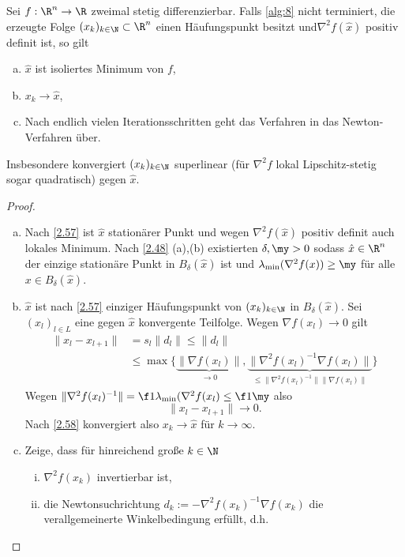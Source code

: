 \begin{st} \label{2.59}
	Sei $f: \R^n \to \R$ zweimal stetig differenzierbar.
	Falls \ref{alg:8} nicht terminiert, die erzeugte Folge $(x_k)_{k\in\N} \subset \R^n$ einen Häufungspunkt besitzt und$\nabla^2 f(\hat x)$ positiv definit ist, so gilt
	\begin{enumerate}[(a)]
		\item
			$\hat x$ ist isoliertes Minimum von $f$,
		\item
			$x_k \to \hat x$,
		\item
			Nach endlich vielen Iterationsschritten geht das Verfahren in das Newton-Verfahren über.
	\end{enumerate}
	Insbesondere konvergiert $(x_k)_{k\in \N}$ superlinear (für $\nabla^2 f$ lokal Lipschitz-stetig sogar quadratisch) gegen $\hat x$.
	\begin{proof}
		\begin{enumerate}[(a)]
			\item
				Nach \ref{2.57} ist $\hat x$ stationärer Punkt und wegen $\nabla^2 f(\hat x)$ positiv definit auch lokales Minimum.
				Nach \ref{2.48} (a),(b) existierten $\delta, \my > 0$ sodass $\hat x \in \R^n$ der einzige stationäre Punkt in $B_\delta(\hat x)$ ist und $\lambda_{\text{min}} (\nabla^2 f(x)) \ge \my$ für alle $x \in B_\delta(\hat x)$.
			\item
				$\hat x$ ist nach \ref{2.57} einziger Häufungspunkt von $(x_k)_{k\in\N}$ in $B_\delta(\hat x)$.
				Sei $(x_l)_{l\in L}$ eine gegen $\hat x$ konvergente Teilfolge.
				Wegen $\nabla f(x_l)  \to 0$ gilt
				\begin{align*}
					\|x_l - x_{l+1}\|
					&= s_l \|d_l\|
					\le \|d_l\| \\
					&\le \max \Big\{ \underbrace{\|\nabla f(x_l)\|}_{\to 0}, \underbrace{\|\nabla^2 f(x_l)^{-1} \nabla f(x_l)\|}_{\le \|\nabla^2 f(x_l)^{-1} \| \|\nabla f(x_l)\|} \Big\}
				\end{align*}
				Wegen $\|\nabla^2 f(x_l)^{-1}\| = \f 1{\lambda_{\text{min}}(\nabla^2 f(x_l)} \le \f 1\my$ also
				\[
					\|x_l - x_{l+1}\| \to 0.
				\]
				Nach \ref{2.58} konvergiert also $x_k \to \hat x$ für $k\to \infty$.
			\item
				Zeige, dass für hinreichend große $k \in \N$
				\begin{enumerate}[(i)]
					\item
						$\nabla^2 f(x_k)$ invertierbar ist,
					\item
						die Newtonsuchrichtung $d_k := - \nabla^2 f(x_k)^{-1} \nabla f(x_k)$ die verallgemeinerte Winkelbedingung erfüllt, d.h.

\end{enumerate}
\end{enumerate}
\end{proof}
\end{st}
